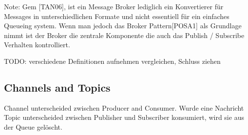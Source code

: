 Note: Gem [TAN06], ist ein Message Broker lediglich ein Konvertierer für
Messages in unterschiedlichen Formate und nicht essentiell für ein einfaches
Queueing system. Wenn man jedoch das Broker Pattern[POSA1] als Grundlage nimmt
ist der Broker die zentrale Komponente die auch das Publish / Subscribe
Verhalten kontrolliert.

TODO: verschiedene Definitionen aufnehmen vergleichen, Schluss ziehen \\

\subsection{Channels and Topics} %
Channel unterscheided zwischen Producer and Consumer. Wurde eine Nachricht
Topic unterscheided zwischen Publisher und Subscriber
konsumiert, wird sie aus der Queue gelöscht.



